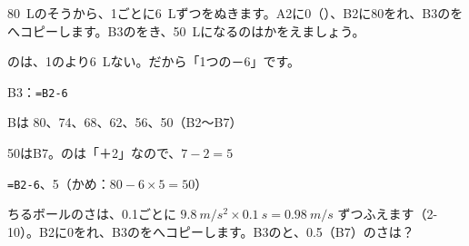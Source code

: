 \begin{reidai}[\R{上}{うえ}の\R{行}{ぎょう}の\R{結果}{けっ|か}を\R{使}{つか}う（ひき\R{算}{ざん}）]
\qty{80}{L}のそうから、1ごとに\qty{6}{L}ずつをぬきます。A2に0（）、B2に80をれ、B3のをへコピーします。B3のをき、\qty{50}{L}になるのはかをえましょう。\par
{}のは、1のより\qty{6}{L}ない。だから「1つの－6」です。\par
\shiki B3：\texttt{=B2-6}\par
\hspace*{2.6\zw}Bは 80、74、68、62、56、50（B2〜B7）\par
\hspace*{2.6\zw}50はB7。のは「＋2」なので、$7-2=5$\par
\kotae \texttt{=B2-6}、5（かめ：$80-6\times5=50$）
\end{reidai}

\begin{jibun}
ちるボールのさは、0.1ごとに $\qty{9.8}{m/s^2}\times\qty{0.1}{s}=\qty{0.98}{m/s}$ ずつふえます（2-10）。B2に0をれ、B3のをへコピーします。B3のと、0.5（B7）のさは？
\end{jibun}

